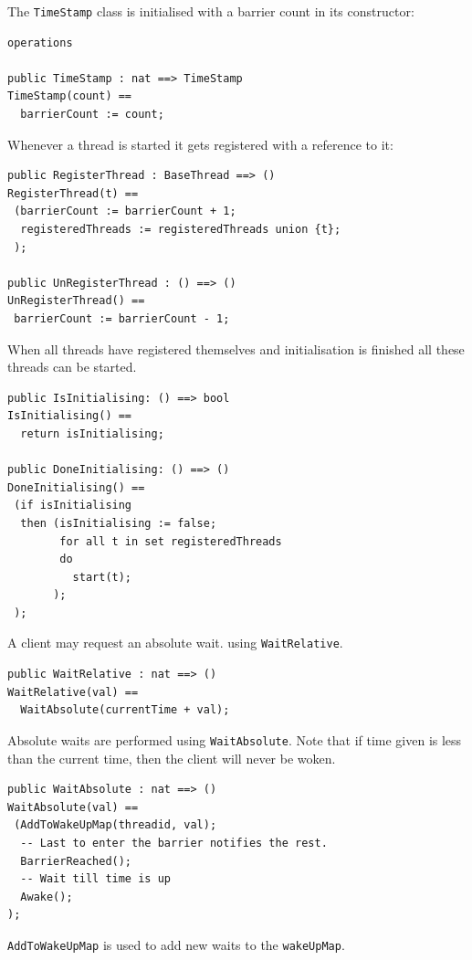 \documentclass{overturerepchap}
\begin{document}
The \texttt{TimeStamp} class is initialised with a barrier count in its
constructor:

\begin{lstlisting}
operations

public TimeStamp : nat ==> TimeStamp
TimeStamp(count) ==
  barrierCount := count;
\end{lstlisting}

Whenever a thread is started it gets registered with a reference to it:

\begin{lstlisting}
public RegisterThread : BaseThread ==> ()
RegisterThread(t) ==
 (barrierCount := barrierCount + 1;
  registeredThreads := registeredThreads union {t};  
 );
 
public UnRegisterThread : () ==> ()
UnRegisterThread() ==
 barrierCount := barrierCount - 1;
\end{lstlisting}

When all threads have registered themselves and initialisation is finished
all these threads can be started.

\begin{lstlisting}
public IsInitialising: () ==> bool
IsInitialising() ==
  return isInitialising;
 
public DoneInitialising: () ==> ()
DoneInitialising() ==
 (if isInitialising
  then (isInitialising := false;
        for all t in set registeredThreads 
        do
          start(t);
       );
 );
\end{lstlisting}

A client may request an absolute wait. using \texttt{WaitRelative}.

\begin{lstlisting}
public WaitRelative : nat ==> ()
WaitRelative(val) ==
  WaitAbsolute(currentTime + val);
\end{lstlisting}

Absolute waits are performed using \texttt{WaitAbsolute}. Note that if time
given is less than the current time, then the client will never be
woken.

\begin{lstlisting}
public WaitAbsolute : nat ==> ()
WaitAbsolute(val) ==
 (AddToWakeUpMap(threadid, val);
  -- Last to enter the barrier notifies the rest.
  BarrierReached();
  -- Wait till time is up
  Awake();
);
\end{lstlisting}

\texttt{AddToWakeUpMap} is used to add new waits to the \texttt{wakeUpMap}.
\end{document}
